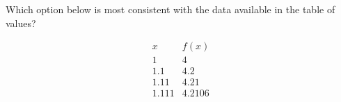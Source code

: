 \documentclass{ximera}
\author{Steven Gubkin}
\begin{document}
\begin{exercise}

Which option below is most consistent with the data available in the table of values?

\[
\begin{array}{c|c}
 x & f(x)\\ \hline
 1 & 4\\ 
 1.1 & 4.2 \\
 1.11 & 4.21\\ 
 1.111 & 4.2106\\ 
\end{array}
\]

\begin{multipleChoice}
\end{multipleChoice}

\end{exercise}
\end{document}
